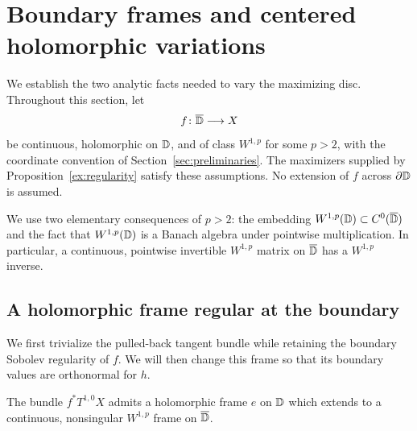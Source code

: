 \section{Boundary frames and centered holomorphic variations}
\label{var:section}

We establish the two analytic facts needed to vary the maximizing disc.
Throughout this section, let
\[
 f\colon\overline{\mathbb D}\longrightarrow X
\]
be continuous, holomorphic on $\mathbb D$, and of class $W^{1,p}$ for some
$p>2$, with the coordinate convention of Section~\ref{sec:preliminaries}. The
maximizers supplied by Proposition~\ref{ex:regularity} satisfy these
assumptions.  No extension of $f$ across $\partial\mathbb D$ is assumed.

We use two elementary consequences of $p>2$: the embedding
$W^{1,p}(\mathbb D)\subset C^0(\overline{\mathbb D})$ and the fact that
$W^{1,p}(\mathbb D)$ is a Banach algebra under pointwise multiplication.
In particular, a continuous, pointwise invertible $W^{1,p}$ matrix on
$\overline{\mathbb D}$ has a $W^{1,p}$ inverse.

\subsection{A holomorphic frame regular at the boundary}

We first trivialize the pulled-back tangent bundle while retaining
the boundary Sobolev regularity of $f$. We will then change this
frame so that its boundary values are orthonormal for $h$.
\begin{lemma}\label{var:initial-frame}
The bundle $f^*T^{1,0}X$ admits a holomorphic frame $e$ on $\mathbb D$ which
extends to a continuous, nonsingular $W^{1,p}$ frame on $\overline{\mathbb D}$.
\end{lemma}

